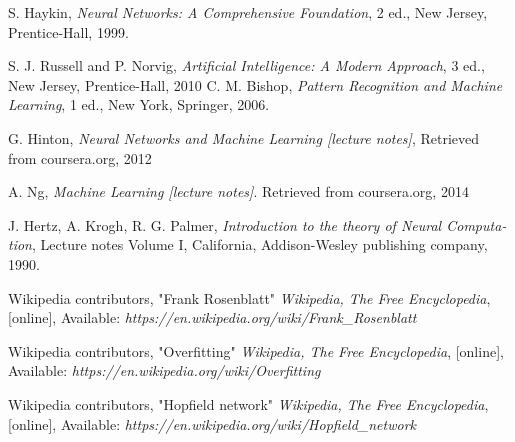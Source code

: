 \documentclass[11pt,a4paper,twocolumn]{article}
\begin{document}
\begin{latin}
{
\small
\singlespacing
\setlength{\itemsep}{-2ex}
\renewcommand{\refname}{\rl{{مراجع}\hfill}}
%
\begin{thebibliography}{1}

      S. Haykin, {\em Neural Networks: A Comprehensive Foundation}, 2 ed., New Jersey, Prentice-Hall, 1999.
    
      S. J. Russell and P. Norvig, {\em Artificial Intelligence: A Modern Approach}, 3 ed., New Jersey, Prentice-Hall, 2010
     C. M. Bishop, {\em Pattern Recognition and Machine Learning}, 1 ed., New York, Springer, 2006.
    

      G. Hinton, {\em Neural Networks and Machine Learning [lecture notes]}, Retrieved from coursera.org, 2012

      A. Ng, {\em Machine Learning [lecture notes]}. Retrieved from coursera.org, 2014
    
     J. Hertz, A. Krogh, R. G. Palmer, {\em Introduction to the theory of Neural Computation}, Lecture notes Volume I, California, Addison-Wesley publishing company, 1990.
    
     Wikipedia contributors, "Frank Rosenblatt" {\em Wikipedia, The Free Encyclopedia}, [online], Available: {\em https://en.wikipedia.org/wiki/Frank\_Rosenblatt}
    
     Wikipedia contributors, "Overfitting" {\em Wikipedia, The Free Encyclopedia}, [online], Available: {\em https://en.wikipedia.org/wiki/Overfitting}
    
     Wikipedia contributors, "Hopfield network" {\em Wikipedia, The Free Encyclopedia}, [online], Available: {\em https://en.wikipedia.org/wiki/Hopfield\_network }

  \end{thebibliography}
}
\end{latin}
\end{document}
